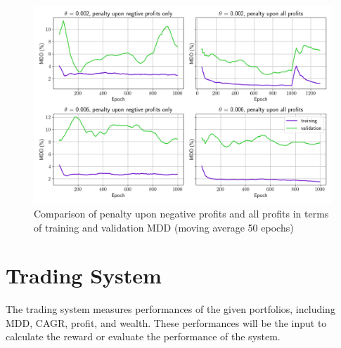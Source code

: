 \begin{figure}[ht]
  \includegraphics[width=15cm]{images/penalty_negtive_profits_compare.png}
  \caption [Comparison of penalty all profits and negative profits only] {Comparison of penalty upon negative profits and all profits in terms of training and validation MDD (moving average 50 epochs)}
  \label{fig:negtive_profits_diagram}
\end{figure}

\section {Trading System}
The trading system measures performances of the given portfolios, including MDD, CAGR, profit, and wealth. These performances will be the input to calculate the reward or evaluate the performance of the system. 



